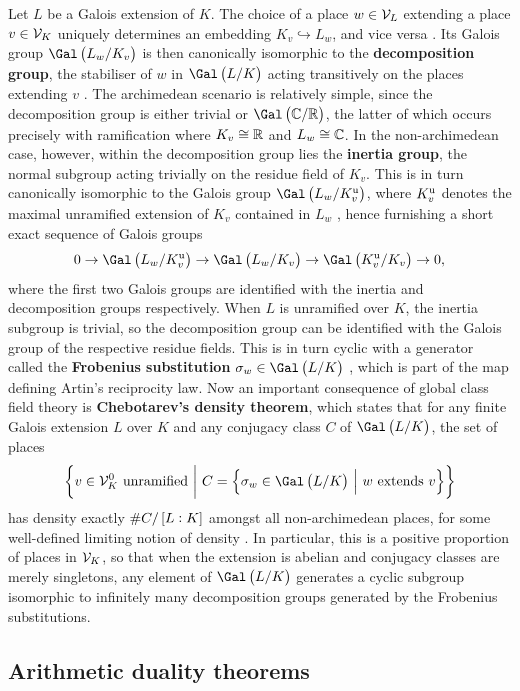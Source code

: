 Let $ L $ be a Galois extension of $ K $. The choice of a place $ w \in \mathcal{V}_L $ extending a place $ v \in \mathcal{V}_K $ uniquely determines an embedding $ K_v \hookrightarrow L_w $, and vice versa \cite[Corollary II.2]{Ser80}. Its Galois group $ \Gal\br{L_w / K_v} $ is then canonically isomorphic to the \textbf{decomposition group}, the stabiliser of $ w $ in $ \Gal\br{L / K} $ acting transitively on the places extending $ v $ \cite[Proposition I.19]{Ser80}. The archimedean scenario is relatively simple, since the decomposition group is either trivial or $ \Gal\br{\CC / \RR} $, the latter of which occurs precisely with ramification where $ K_v \cong \mathbb{R} $ and $ L_w \cong \mathbb{C} $. In the non-archimedean case, however, within the decomposition group lies the \textbf{inertia group}, the normal subgroup acting trivially on the residue field of $ K_v $. This is in turn canonically isomorphic to the Galois group $ \Gal\br{L_w / K_v^\u} $, where $ K_v^{\mathrm{u}} $ denotes the maximal unramified extension of $ K_v $ contained in $ L_w $ \cite[Proposition I.21]{Ser80}, hence furnishing a short exact sequence of Galois groups
$$ 0 \to \Gal\br{L_w / K_v^\u} \to \Gal\br{L_w / K_v} \to \Gal\br{K_v^\u / K_v} \to 0, $$
where the first two Galois groups are identified with the inertia and decomposition groups respectively. When $ L $ is unramified over $ K $, the inertia subgroup is trivial, so the decomposition group can be identified with the Galois group of the respective residue fields. This is in turn cyclic with a generator called the \textbf{Frobenius substitution} $ \sigma_w \in \Gal\br{L / K} $ \cite[Section I.8]{Ser80}, which is part of the map defining Artin's reciprocity law. Now an important consequence of global class field theory is \textbf{Chebotarev's density theorem}, which states that for any finite Galois extension $ L $ over $ K $ and any conjugacy class $ C $ of $ \Gal\br{L / K} $, the set of places
$$ \cbr{v \in \VVV_K^0 \ \text{unramified} \st C = \cbr{\sigma_w \in \Gal\br{L / K} \st w \ \text{extends} \ v}} $$
has density exactly $ \#C / \sbr{L : K} $ amongst all non-archimedean places, for some well-defined limiting notion of density \cite[Theorem V.3.23]{Mil13}. In particular, this is a positive proportion of places in $ \mathcal{V}_K $, so that when the extension is abelian and conjugacy classes are merely singletons, any element of $ \Gal\br{L / K} $ generates a cyclic subgroup isomorphic to infinitely many decomposition groups generated by the Frobenius substitutions.

\pagebreak

\subsection{Arithmetic duality theorems}

